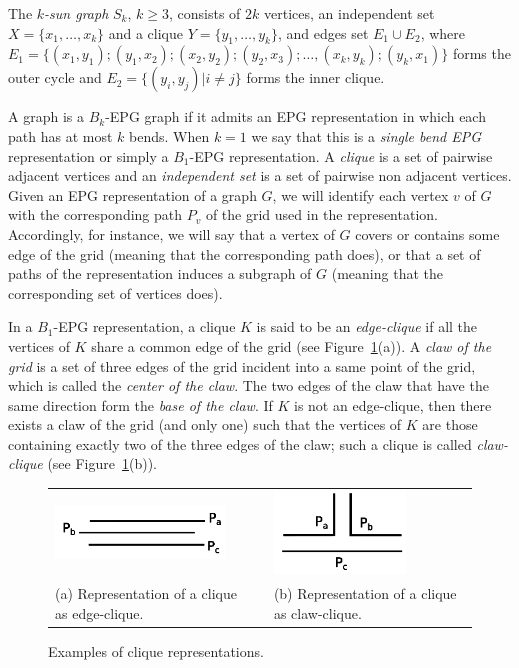\documentclass{dmgt}
\begin{document}
The $k$\textit{-sun graph }$S_k$, $k \geq 3$, consists of
$2k$ vertices, an independent set $X = \{x_1, \dots, x_k\}$ and a clique $Y = \{y_1, \dots, y_k\}$, and edges set $E_1 \cup E_2$, where $E_ 1=\{ (x_1,y_1); (y_1, x_2); (x_2, y_2); (y_2, x_3); \dots , (x_k, y_k); (y_k, x_1) \}$ forms the outer cycle and $E_2= \{(y_i, y_j) |i\neq j\}$ forms the inner clique.

A graph is a $ B_k$-EPG graph if it admits an EPG representation in which each path has at most $k$ bends.  When $ k = 1 $ we say that this is a \emph{single bend EPG} representation or simply a $B_1$-EPG representation.
A \textit{clique} is a set of pairwise adjacent vertices and
an \textit{independent set} is a set of pairwise non adjacent vertices.
Given an EPG representation of a graph $G$, we will identify each vertex $v$ of $G$ with the corresponding path $P_{v}$ of the grid used in the representation. Accordingly, for instance, we will say that a vertex of $G$ covers or contains some edge of the grid (meaning that the corresponding path does), or that a set of paths of the representation
induces a subgraph of $G$ (meaning that the corresponding set of vertices does). 

In  a $B_1$-EPG representation, a clique $K$  is said to be
 an \textit{edge-clique} if all  the vertices of $K$ share a common edge of the grid (see Figure~\ref{fig:cliquesRepresentation}(a)).
 A \textit{claw of the grid} is a set of three edges of the grid incident into a same point of the grid, which is called
  the \textit{center of the claw}. The two edges of the claw that have the same direction form
    the \textit{ base of the claw}. If $K$ is not an edge-clique, then there exists
    a claw of the grid (and only one) such that  the vertices of $K$ are those containing exactly two of the three edges of the claw; such a  clique is called  \textit{claw-clique} \cite{golumbic2009} (see Figure~\ref{fig:cliquesRepresentation}(b)).

    
%    
\begin{figure}[htb]
  \centering
  \begin{tabular}{  p{4cm} p{0.7cm} p{4cm} }
    \includegraphics[width=4.5cm]{edge-clique.png} & &
    \includegraphics[width=3.5cm]{claw-clique.png}
    \\
    \footnotesize %
    (a)  \footnotesize Representation of a clique as edge-clique. && \footnotesize (b) Representation  of a clique as claw-clique.\\
  \end{tabular}

 \caption{Examples of clique representations.} \label{fig:cliquesRepresentation}
\end{figure}
\end{document}
